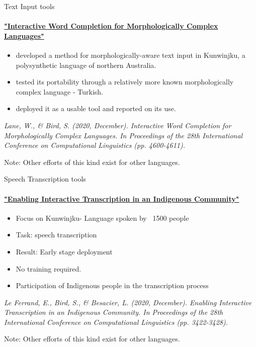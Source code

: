 \documentclass{beamer}
\begin{document}
\begin{frame}{Text Input tools}
    \framesubtitle{\href{https://www.aclweb.org/anthology/2020.coling-main.405/}{"Interactive Word Completion for Morphologically Complex Languages"}}
    \begin{itemize}
        \item developed a method for morphologically-aware text input in Kunwinjku, a polysynthetic language of
northern Australia. 
        \item tested its portability through a relatively more known morphologically complex language - Turkish.
        \item deployed it as a usable tool and reported on its use. 
    \end{itemize}
    
    \textit{Lane, W., \& Bird, S. (2020, December). Interactive Word Completion for Morphologically Complex Languages. In Proceedings of the 28th International Conference on Computational Linguistics (pp. 4600-4611).}
    
    Note: Other efforts of this kind exist for other languages. 
\end{frame}

\begin{frame}{Speech Transcription tools}
\framesubtitle{\href{https://www.aclweb.org/anthology/2020.coling-main.303/}{"Enabling Interactive Transcription in an Indigenous Community"}}
    \begin{itemize}
        \item Focus on Kunwinjku- Language spoken by ~1500 people
        \item Task: speech transcription
        \item Result: Early stage deployment
        \item No training required.
        \item Participation of Indigenous people in the transcription process
    \end{itemize}
    
\textit{Le Ferrand, E., Bird, S., \& Besacier, L. (2020, December). Enabling Interactive Transcription in an Indigenous Community. In Proceedings of the 28th International Conference on Computational Linguistics (pp. 3422-3428).}

Note: Other efforts of this kind exist for other languages. 
\end{frame}
\end{document}
